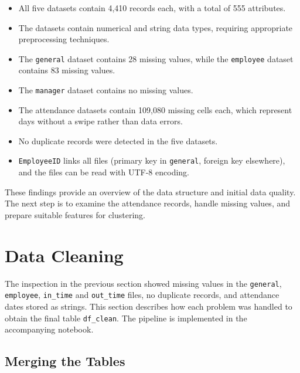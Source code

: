 \documentclass[12pt,a4paper]{article}
\begin{document}
\begin{itemize}
    \item All five datasets contain 4,410 records each,
    with a total of 555 attributes.

    \item The datasets contain numerical and string data types,
    requiring appropriate preprocessing techniques.

    \item The \texttt{general} dataset contains 28 missing values,
    while the \texttt{employee} dataset contains 83 missing values.

    \item The \texttt{manager} dataset contains no missing values.

    \item The attendance datasets contain 109,080 missing cells each,
    which represent days without a swipe rather than data errors.

    \item No duplicate records were detected in the five datasets.

    \item \texttt{EmployeeID} links all files (primary key in
    \texttt{general}, foreign key elsewhere), and the files can be
    read with UTF-8 encoding.
\end{itemize}

These findings provide an overview of the data structure
and initial data quality. The next step is to examine the
attendance records, handle missing values, and prepare
suitable features for clustering.
\section{Data Cleaning}
\label{sec:cleaning}

The inspection in the previous section showed missing values in the
\texttt{general}, \texttt{employee}, \texttt{in\_time} and
\texttt{out\_time} files, no duplicate records, and attendance dates stored
as strings. This section describes how each problem was handled to obtain the
final table \texttt{df\_clean}. The pipeline is implemented in the
accompanying notebook.

\subsection{Merging the Tables}
\end{document}

